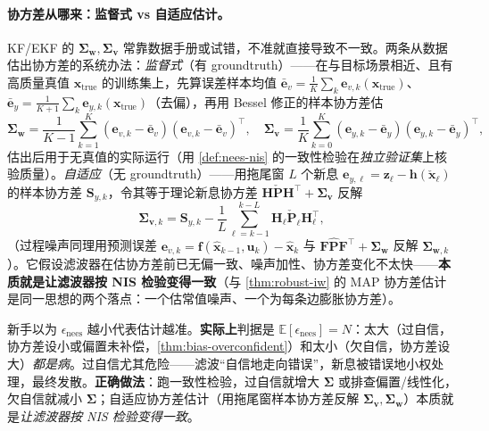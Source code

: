 \paragraph{协方差从哪来：监督式 vs 自适应估计。}
KF/EKF 的 $\boldsymbol{\Sigma}_{\mathbf{w}},\boldsymbol{\Sigma}_{\mathbf{v}}$ 常靠数据手册或试错，不准就直接导致不一致。两条从数据估出协方差的系统办法\cite{barfoot2024state}：\emph{监督式}（有 groundtruth）——在与目标场景相近、且有高质量真值 $\mathbf{x}_{\text{true}}$ 的训练集上，先算误差样本均值 $\bar{\mathbf{e}}_{v}=\tfrac{1}{K}\sum_{k}\mathbf{e}_{v,k}(\mathbf{x}_{\text{true}})$、$\bar{\mathbf{e}}_{y}=\tfrac{1}{K+1}\sum_{k}\mathbf{e}_{y,k}(\mathbf{x}_{\text{true}})$（去偏），再用 Bessel 修正的样本协方差估
\begin{equation}
  \boldsymbol{\Sigma}_{\mathbf{w}}=\frac{1}{K-1}\sum_{k=1}^{K}(\mathbf{e}_{v,k}-\bar{\mathbf{e}}_v)(\mathbf{e}_{v,k}-\bar{\mathbf{e}}_v)^\top,\quad
  \boldsymbol{\Sigma}_{\mathbf{v}}=\frac{1}{K}\sum_{k=0}^{K}(\mathbf{e}_{y,k}-\bar{\mathbf{e}}_y)(\mathbf{e}_{y,k}-\bar{\mathbf{e}}_y)^\top,
  \label{eq:eskf-supcov}
\end{equation}
估出后用于无真值的实际运行（用 \cref{def:nees-nis} 的一致性检验在\emph{独立验证集}上核验质量）。\emph{自适应}（无 groundtruth）——用拖尾窗 $L$ 个新息 $\mathbf{e}_{y,\ell}=\mathbf{z}_\ell-\mathbf{h}(\check{\mathbf{x}}_\ell)$ 的样本协方差 $\mathbf{S}_{y,k}$，令其等于理论新息协方差 $\mathbf{H}\check{\mathbf{P}}\mathbf{H}^\top+\boldsymbol{\Sigma}_{\mathbf{v}}$ 反解
\begin{equation}
  \boldsymbol{\Sigma}_{\mathbf{v},k}=\mathbf{S}_{y,k}-\frac{1}{L}\sum_{\ell=k-1}^{k-L}\mathbf{H}_\ell\check{\mathbf{P}}_\ell\mathbf{H}_\ell^\top,
  \label{eq:eskf-adapcov}
\end{equation}
（过程噪声同理用预测误差 $\mathbf{e}_{v,k}=\mathbf{f}(\hat{\mathbf{x}}_{k-1},\mathbf{u}_k)-\hat{\mathbf{x}}_k$ 与 $\mathbf{F}\hat{\mathbf{P}}\mathbf{F}^\top+\boldsymbol{\Sigma}_{\mathbf{w}}$ 反解 $\boldsymbol{\Sigma}_{\mathbf{w},k}$）。它假设滤波器在估协方差前已无偏一致、噪声加性、协方差变化不太快——\textbf{本质就是让滤波器按 NIS 检验变得一致}（与 \cref{thm:robust-iw} 的 MAP 协方差估计是同一思想的两个落点：一个估常值噪声、一个为每条边膨胀协方差）。

\begin{pitfall}
新手以为 $\epsilon_{\text{nees}}$ 越小代表估计越准。\textbf{实际上}判据是 $\mathbb{E}[\epsilon_{\text{nees}}]=N$：太大（过自信，协方差设小或偏置未补偿，\cref{thm:bias-overconfident}）和太小（欠自信，协方差设大）\emph{都是病}。过自信尤其危险——滤波“自信地走向错误”，新息被错误地小权处理，最终发散。\textbf{正确做法}：跑一致性检验，过自信就增大 $\boldsymbol{\Sigma}$ 或排查偏置/线性化，欠自信就减小 $\boldsymbol{\Sigma}$；自适应协方差估计（用拖尾窗样本协方差反解 $\boldsymbol{\Sigma}_{\mathbf{v}},\boldsymbol{\Sigma}_{\mathbf{w}}$）本质就是\emph{让滤波器按 NIS 检验变得一致}\cite{barfoot2024state}。
\end{pitfall}

